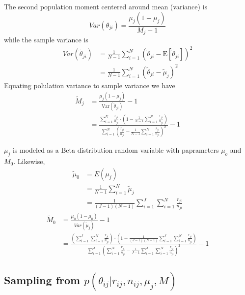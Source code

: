 \documentclass[11pt,reqno]{amsart}
\begin{document}
The second population moment centered around mean (variance) is
\begin{equation}
 Var(\theta_{ji}) = \frac{\mu_j(1-\mu_j)}{M_j+1}
\end{equation}
while the sample variance is
\begin{equation}
 \begin{split}
  Var(\tilde{\theta}_{ji}) &= \frac{1}{N-1}\sum_{i=1}^N(\tilde{\theta}_{ji}-\text{E}[\tilde{\theta}_{ji}])^2\\ &= \frac{1}{N-1}\sum_{i=1}^N(\tilde{\theta}_{ji}-\tilde{\mu}_j)^2
 \end{split}
\end{equation}
Equating polulation variance to sample variance we have
\begin{equation}
 \begin{split}
  \tilde{M}_j &=\frac{\mu_j(1-\mu_j)}{\text{Var}(\tilde{\theta}_{ji})}-1\\ &= \frac{\sum_{i=1}^N\frac{r_{ji}}{n_{ji}}\cdot\left(1-\frac{1}{N-1}\sum_{i=1}^N\frac{r_{ji}}{n_{ji}}\right)}{\sum_{i=1}^N\left(\frac{r_{ji}}{n_{ji}}-\frac{1}{N-1}\sum_{i=1}^N\frac{r_{ji}}{n_{ji}}\right)^2}-1
 \end{split}
\end{equation}

$\mu_j$ is modeled as a Beta distribution random variable with paprameters $\mu_o$ and $M_0$. Likewise,
\begin{equation}
\begin{split}
 \tilde{\mu}_0 &= E(\mu_j)\\ &= \frac{1}{N-1}\sum_{i=1}^N\tilde{\mu}_j\\ &= \frac{1}{(J-1)(N-1)}\sum_{i=1}^J\sum_{i=1}^N\frac{r_{ji}}{n_{ji}}
\end{split}
\end{equation}
\begin{equation}
\begin{split}
 \tilde{M}_0 &=\frac{\tilde{\mu}_0(1-\tilde{\mu}_0)}{Var(\tilde{\mu}_j)}-1\\ &= \frac{\left(\sum_{i=1}^J\sum_{i=1}^N\frac{r_{ji}}{n_{ji}}\right)\cdot\left(1-\frac{1}{(J-1)(N-1)}\sum_{i=1}^J\sum_{i=1}^N\frac{r_{ji}}{n_{ji}}\right)}{\sum_{i=1}^J\left(\sum_{i=1}^N\frac{r_{ji}}{n_{ji}}-\frac{1}{J-1}\sum_{i=1}^J\sum_{i=1}^N\frac{r_{ji}}{n_{ji}}\right)^2}-1
\end{split}
\end{equation}


\subsection{Sampling from $p \left( \theta_{ij} |r_{ij},n_{ij},\mu_j,M \right)$}
\end{document}

